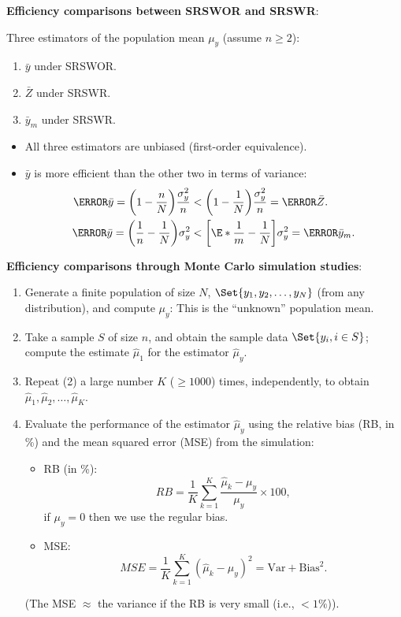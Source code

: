 \textbf{Efficiency comparisons between SRSWOR and SRSWR}:

Three estimators of the population mean $ \mu_y $ (assume $ n\ge 2 $):
\begin{enumerate}
      \item $ \bar{y} $ under SRSWOR\@.
      \item $ \bar{Z} $ under SRSWR\@.
      \item $ \bar{y}_m $ under SRSWR\@.
\end{enumerate}
\begin{itemize}
      \item All three estimators are unbiased (first-order equivalence).
      \item $ \bar{y} $ is more efficient than the other two in terms of variance:
            \begin{align*}
                  \V{\bar{y}}=\biggl(1-\frac{n}{N}\biggr)\frac{\sigma_y^2}{n} & <\biggl(1-\frac{1}{N}\biggr)\frac{\sigma_y^2}{n}=\V{\bar{Z}}.        \\
                  \V{\bar{y}}=\biggl(\frac{1}{n}-\frac{1}{N}\biggr)\sigma_y^2 & <\biggl[\E*{\frac{1}{m}}-\frac{1}{N}\biggr]\sigma_y^2=\V{\bar{y}_m}.
            \end{align*}
\end{itemize}

\textbf{Efficiency comparisons through Monte Carlo simulation studies}:
\begin{enumerate}
      \item Generate a finite population of size $ N $, $ \Set{y_1,y_2,\ldots,y_N} $ (from any distribution),
            and compute $ \mu_y $: This is the ``unknown'' population mean.
      \item Take a sample $ S $ of size $ n $, and obtain the sample data $ \Set{y_i,i\in S} $;
            compute the estimate $ \hat{\mu}_1 $ for the estimator $ \hat{\mu}_y $.
      \item Repeat (2) a large number $ K $ ($ \ge 1000 $) times, independently, to obtain $ \hat{\mu}_1,\hat{\mu}_2,\ldots,\hat{\mu}_K $.
      \item Evaluate the performance of the estimator $ \hat{\mu}_y $ using the relative bias (RB, in \%) and the mean squared
            error (MSE) from the simulation:
            \begin{itemize}
                  \item RB (in \%):
                        \[ RB=\frac{1}{K}\sum_{k=1}^{K}\frac{\hat{\mu}_k-\mu_y}{\mu_y}\times 100, \]
                        if $ \mu_y=0 $ then we use the regular bias.
                  \item MSE\@:
                        \[ MSE=\frac{1}{K}\sum_{k=1}^{K}(\hat{\mu}_k-\mu_y)^2=\text{Var}+\text{Bias}^2. \]
            \end{itemize}
            (The MSE $ \approx $ the variance if the RB is very small (i.e., $ <1\% $)).
\end{enumerate}

